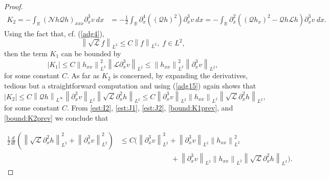 \documentclass[10pt,a4paper]{amsart}
\newcommand{\RR}{\mathbb R}
\newcommand{\norm}[1]{\left\| #1 \right\|}
\newcommand{\pa}{\partial}
\begin{document}
\begin{proof}
\begin{align*}
K_{2}=-\int_{\RR} (\mathscr{N}h\mathscr{Q}h)_{xxx} \pa_{x}^{3}v \  dx &=- \frac{1}{2} \int_{\RR} \pa_{x}^{4}\left( (\mathscr{Q}h)^{2}
\right) \pa_{x}^{3}v \  dx =-\int_{\RR}\pa_{x}^{2}\left( (\mathscr{Q}h_{x})^{2}-\mathscr{Q}h\mathscr{L}h\right) \pa_{x}^{3}v \  dx.
\end{align*}
Using the fact that, cf. (\ref{adg4}), 
\begin{equation}\label{adg15}
\norm{\sqrt{\mathscr{L}}f}_{L^2}\leq C \norm{f}_{L^{2}},\; f\in L^{2},
\end{equation}
then the term $K_{1}$ can be bounded by
\begin{equation}\label{bound:K1prev}
|K_{1}|\leq C \norm{h_{xx}}_{L^{2}}^{2}\norm{\mathscr{L}\pa_{x}^{3}v}_{L^{2}} \leq \norm{h_{xx}}_{L^{2}}^{2}\norm{\pa_{x}^{3}v}_{L^{2}},
\end{equation}
for some constant $C$. As far as $K_{2}$ is concerned, by expanding the derivatives, tedious but a straightforward computation and using (\ref{adg15}) again shows that
\begin{equation}\label{bound:K2prev}
|K_2| \leq C \norm{\mathscr{Q}h}_{L^{\infty}} \norm{\pa_{x}^{3}v}_{L^{2}}\norm{\sqrt{\mathscr{L}}\pa_{x}^2 h}_{L^{2}} \leq C    \norm{\pa_{x}^{3}v}_{L^{2}}\norm{h_{xx}}_{L^{2}} \norm{\sqrt{\mathscr{L}}\pa_{x}^2 h}_{L^{2}},
\end{equation}
for some constant $C$. From \eqref{est:I2}, \eqref{est:J1}, \eqref{est:J2}, \eqref{bound:K1prev}, and \eqref{bound:K2prev} we conclude that

\begin{align}
\frac{1}{2}\frac{d}{dt}\left( \norm{\sqrt{\mathscr{L}}\pa_{x}^{2}h}_{L^{2}}^{2}+ \norm{\pa_{x}^{3}v}_{L^{2}}^{2} \right) &\leq  C \bigg( \norm{\pa_{x}^{3}v}^{3}_{L^{2}}+\norm{\pa_{x}^{3}v}_{L^{2}} \norm{h_{xx}}^{2}_{L^{2}} \nonumber \\
&\hspace{3cm} +\norm{\pa_{x}^{3}v}_{L^{2}}\norm{h_{xx}}_{L^{2}} \norm{\sqrt{\mathscr{L}}\pa_{x}^2 h}_{L^{2}} \bigg).\label{adg16}
\end{align}


\end{proof}
\end{document}
